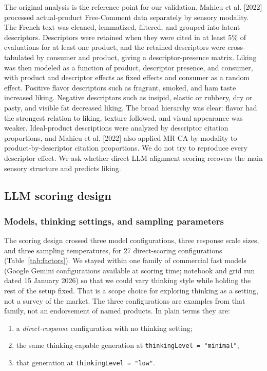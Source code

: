 \documentclass[11pt]{article}
\begin{document}
The original analysis is the reference point for our validation. Mahieu et al.
[2022] processed actual-product Free-Comment data separately by sensory
modality. The French text was cleaned, lemmatized, filtered, and grouped into
latent descriptors. Descriptors were retained when they were cited in at least
5\% of evaluations for at least one product, and the retained descriptors were
cross-tabulated by consumer and product, giving a descriptor-presence matrix.
Liking was then modeled as a function of product, descriptor presence, and
consumer, with product and descriptor effects as fixed effects and consumer as
a random effect. Positive flavor descriptors such as fragrant, smoked, and ham
taste increased liking. Negative descriptors such as insipid, elastic or
rubbery, dry or pasty, and visible fat decreased liking. The broad hierarchy
was clear: flavor had the strongest relation to liking, texture followed, and
visual appearance was weaker. Ideal-product descriptions were analyzed by
descriptor citation proportions, and Mahieu et al. [2022] also applied MR-CA by
modality to product-by-descriptor citation proportions. We do not try to
reproduce every descriptor effect. We ask whether direct LLM alignment scoring
recovers the main sensory structure and predicts liking.

\subsection{LLM scoring design}
\label{sec:design}

\subsubsection{Models, thinking settings, and sampling parameters}
\label{sec:models}

The scoring design crossed three model configurations, three response scale
sizes, and three sampling temperatures, for 27 direct-scoring configurations
(Table~\ref{tab:factors}). We stayed within one family of commercial fast
models (Google Gemini configurations available at scoring time; notebook and
grid run dated 15 January 2026) so that we could vary thinking style while
holding the rest of the setup fixed. That is a scope choice for exploring
thinking as a setting, not a survey of the market. The three configurations
are examples from that family, not an endorsement of named products. In plain
terms they are:

\begin{enumerate}[leftmargin=*,itemsep=0.25em]
\item a \emph{direct-response} configuration with no thinking setting;
\item the same thinking-capable generation at \texttt{thinkingLevel =
"minimal"};
\item that generation at \texttt{thinkingLevel = "low"}.
\end{enumerate}
\end{document}
